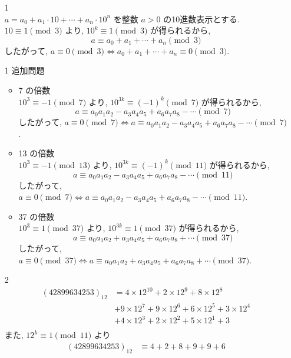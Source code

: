 \documentclass[12pt,a4paper]{jsarticle}
\begin{document}
\begin{enumerate}
 \item[1]  \mbox{} \\
	$a = a_0 + a_1 \cdot 10 + \cdots + a_n \cdot 10^n$ を整数 $a > 0$ の10進数表示とする. \\
	$10 \equiv 1 \pmod{3}$ より, $10^k \equiv 1 \pmod{3}$ が得られるから,
	\[ a \equiv a_0 + a_1 + \cdots + a_n \pmod{3} \]
	したがって, $a \equiv 0 \pmod{3} \Leftrightarrow a_0 + a_1 + \cdots + a_n \equiv 0 \pmod{3}$.
 \item[1] 追加問題 \\
	\begin{itemize}
	 \item 7 の倍数 \\
		$10^3 \equiv -1 \pmod{7}$ より, $10^{3k} \equiv {(-1)}^k \pmod{7}$ が得られるから,
		\[ a \equiv a_0 a_1 a_2 - a_3 a_4 a_5 + a_6 a_7 a_8 - \cdots \pmod{7} \]
		したがって, $a \equiv 0 \pmod{7} \Leftrightarrow a \equiv a_0 a_1 a_2 - a_3 a_4 a_5 + a_6 a_7 a_8 - \cdots \pmod{7}$.
	 \item 13 の倍数 \\
		$10^3 \equiv -1 \pmod{13}$ より, $10^{3k} \equiv {(-1)}^k\pmod{11}$ が得られるから,
		\[ a \equiv a_0 a_1 a_2 - a_3 a_4 a_5 + a_6 a_7 a_8 - \cdots \pmod{11} \]
		したがって, $a \equiv 0 \pmod{7} \Leftrightarrow a \equiv a_0 a_1 a_2 - a_3 a_4 a_5 + a_6 a_7 a_8 - \cdots \pmod{11}$.
	 \item 37 の倍数 \\
		$10^3 \equiv 1 \pmod{37}$ より, $10^{3k} \equiv 1 \pmod{37}$ が得られるから,
		\[ a \equiv a_0 a_1 a_2 + a_3 a_4 a_5 + a_6 a_7 a_8 + \cdots \pmod{37} \]
		したがって, $a \equiv 0 \pmod{37} \Leftrightarrow a \equiv a_0 a_1 a_2 + a_3 a_4 a_5 + a_6 a_7 a_8 + \cdots \pmod{37}$.
	\end{itemize}
 \item[2]  \mbox{} \\
 \begin{align*}
 (42899634253)_{12} &= 4 \times 12^{10} + 2 \times 12^{9} + 8 \times 12^{8} \\
  & + 9 \times 12^{7} + 9 \times 12^{6} + 6 \times 12^{5} +3 \times 12^{4} \\
  & + 4 \times 12^{3} + 2 \times 12^{2} + 5 \times 12^{1} + 3 \\
 \end{align*}
 また, $12^{k} \equiv 1 \pmod{11}$ より
 \begin{align*}
 (42899634253)_{12}
 &\equiv 4 + 2 + 8 + 9 + 9 + 6 \\

\end{align*}
\end{enumerate}
\end{document}
